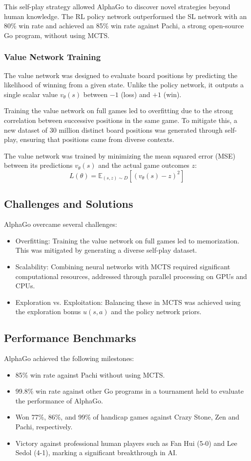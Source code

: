 This self-play strategy allowed AlphaGo to discover novel strategies beyond human knowledge. The RL policy network outperformed the SL network with an 80\% win rate and achieved an 85\% win rate against Pachi, a strong open-source Go program, without using MCTS.

\subsubsection{Value Network Training}
The value network was designed to evaluate board positions by predicting the likelihood of winning from a given state. Unlike the policy network, it outputs a single scalar value \( v_\theta(s) \) between \(-1\) (loss) and \(+1\) (win).

Training the value network on full games led to overfitting due to the strong correlation between successive positions in the same game. To mitigate this, a new dataset of 30 million distinct board positions was generated through self-play, ensuring that positions came from diverse contexts.

The value network was trained by minimizing the mean squared error (MSE) between its predictions \( v_\theta(s) \) and the actual game outcomes \( z \):
\[
L(\theta) = \mathbb{E}_{(s, z) \sim D} \left[ (v_\theta(s) - z)^2 \right]
\]
\subsection{Challenges and Solutions}
AlphaGo overcame several challenges:
\begin{itemize}
    \item Overfitting: Training the value network on full games led to memorization. This was mitigated by generating a diverse self-play dataset.
    \item Scalability: Combining neural networks with MCTS required significant computational resources, addressed through parallel processing on GPUs and CPUs.
    \item Exploration vs. Exploitation: Balancing these in MCTS was achieved using the exploration bonus \( u(s, a) \) and the policy network priors.
\end{itemize}

\subsection{Performance Benchmarks}
AlphaGo achieved the following milestones:
\begin{itemize}
    \item 85\% win rate against Pachi without using MCTS.
    \item 99.8\% win rate against other Go programs in a tournament held to evaluate the performance of AlphaGo.
    \item Won 77\%, 86\%, and 99\% of handicap games against Crazy Stone, Zen and Pachi, respectively.
    \item Victory against professional human players such as Fan Hui (5-0) and Lee Sedol (4-1), marking a significant breakthrough in AI.
\end{itemize}
